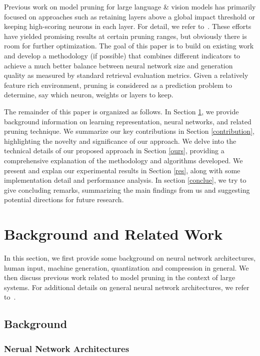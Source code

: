 \documentclass{article} %
\begin{document}
Previous work on model pruning for large language \& vision models has primarily focused on approaches such as retaining layers above a global impact threshold or keeping high-scoring neurons in each layer. For detail, we refer to~\citep{magnitude15, sparsegpt23, wanda24}. These efforts have yielded promising results at certain pruning ranges, but obviously there is room for further optimization. The goal of this paper is to build on existing work and develop a methodology (if possible) that combines different indicators to achieve a much better balance between neural network size and generation quality as measured by standard retrieval evaluation metrics. Given a relatively feature rich environment, pruning is considered as a prediction problem to determine, say which neuron, weights or layers to keep.

The remainder of this paper is organized as follows. In Section \ref{background}, we provide background information on learning representation, neural networks, and related pruning technique. We summarize our key contributions in Section \ref{contribution}, highlighting the novelty and significance of our approach. We delve into the technical details of our proposed approach in Section \ref{ours}, providing a comprehensive explanation of the methodology and algorithms developed. We present and explan our experimental results in Section \ref{res}, along with some implementation detail and performance analysis. In section \ref{conclue}, we try to give concluding remarks, summarizing the main findings from us and suggesting potential directions for future research.

\section{Background and Related Work}
\label{background}

In this section, we first provide some background on neural network architectures, human input, machine generation, quantization and compression in general. We then discuss previous work related to model pruning in the context of large systems. For additional details on general neural network architectures, we refer to~\citep{goodfellow16, aitextbook20}.

\subsection{Background}
\subsubsection{Nerual Network Architectures}
\end{document}
